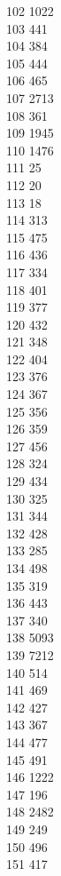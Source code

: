 { 102	1022 \\
 103	441 \\
 104	384 \\
 105	444 \\
 106	465 \\
 107	2713 \\
 108	361 \\
 109	1945 \\
 110	1476 \\
 111	25 \\
 112	20 \\
 113	18 \\
 114	313 \\
 115	475 \\
 116	436 \\
 117	334 \\
 118	401 \\
 119	377 \\
 120	432 \\
 121	348 \\
 122	404 \\
 123	376 \\
 124	367 \\
 125	356 \\
 126	359 \\
 127	456 \\
 128	324 \\
 129	434 \\
 130	325 \\
 131	344 \\
 132	428 \\
 133	285 \\
 134	498 \\
 135	319 \\
 136	443 \\
 137	340 \\
 138	5093 \\
 139	7212 \\
 140	514 \\
 141	469 \\
 142	427 \\
 143	367 \\
 144	477 \\
 145	491 \\
 146	1222 \\
 147	196 \\
 148	2482 \\
 149	249 \\
 150	496 \\
 151	417 \\
}
